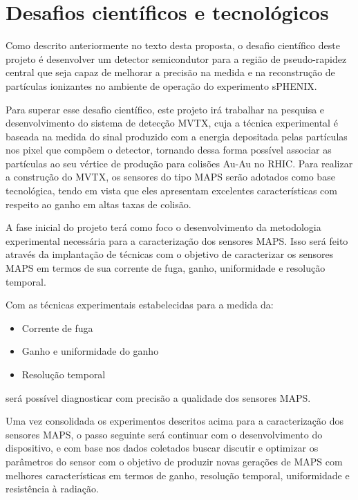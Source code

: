 \chapter{Desafios científicos e tecnológicos}

Como descrito anteriormente no texto desta proposta, o desafio científico deste projeto é desenvolver um detector semicondutor para a região de pseudo-rapidez central que seja capaz de melhorar a precisão na medida e na reconstrução de partículas ionizantes no ambiente de operação do experimento sPHENIX. 

Para superar esse desafio científico, este projeto irá trabalhar na pesquisa e desenvolvimento do sistema de detecção MVTX, cuja a técnica experimental é baseada na medida do sinal produzido com a energia depositada pelas partículas nos pixel que compõem o detector, tornando dessa forma possível associar as partículas ao seu vértice de produção para colisões Au-Au no RHIC. Para realizar a construção do MVTX, os sensores do tipo MAPS serão adotados como base tecnológica, tendo em vista que eles apresentam excelentes características com respeito ao ganho em altas taxas de colisão. 

A fase inicial do projeto terá como foco o desenvolvimento da metodologia experimental necessária para a caracterização dos sensores MAPS. Isso será feito através da implantação de técnicas  com o objetivo de caracterizar os sensores MAPS em termos de sua corrente de fuga, ganho, uniformidade e resolução temporal.

Com as técnicas experimentais estabelecidas para a medida da:

\begin{itemize}
\item Corrente de fuga
\item Ganho e uniformidade do ganho
\item Resolução temporal 
\end{itemize}
será possível diagnosticar com precisão a qualidade dos sensores MAPS.

Uma vez consolidada os experimentos descritos acima para a caracterização dos sensores MAPS, o passo seguinte será continuar com o desenvolvimento do dispositivo, e com base nos dados coletados buscar discutir e optimizar os parâmetros do sensor com o objetivo de produzir novas gerações de MAPS com melhores características em termos de ganho, resolução temporal, uniformidade e resistência à radiação. 

